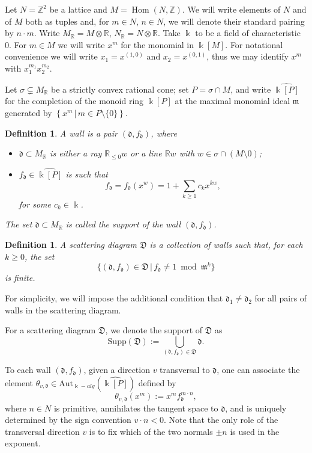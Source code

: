 \documentclass[10pt]{amsart}
\newtheorem{defn}[theorem]{Definition}
\theoremstyle{remark}
\numberwithin{equation}{section}
\newcommand{\RR}{\mathbb{R}}
\newcommand{\ZZ}{\mathbb{Z}}
\newcommand{\fd}{\mathfrak{d}}
\newcommand{\fD}{\mathfrak{D}}
\newcommand{\fm}{\mathfrak{m}}
\newcommand{\Hom}{\operatorname{Hom}}
\begin{document}
Let $N = \ZZ^2$ be a lattice and $M = \Hom (N, \ZZ)$. We will write elements of
$N$ and of $M$ both as tuples and, for $m\in N$, $n\in N$, we will denote their 
standard pairing by $n \cdot m$. Write
$M_{\RR} = M\otimes\RR$, $N_{\RR} = N\otimes\RR$. Take $\Bbbk$ to be a field of
characteristic 0.  For $m\in M$ we will write $x^m$ for the monomial in
$\Bbbk[M]$.  For notational convenience we will write $x_1=x^{(1,0)}$ and
$x_2=x^{(0,1)}$, thus we may identify $x^m$ with $x_1^{m_1}x_2^{m_2}$.

Let $\sigma \subsetneq M_{\RR}$ be a strictly convex rational cone; set
$P=\sigma \cap M$, and write $\widehat{\Bbbk[P]}$ for the completion of the
monoid ring $\Bbbk[P]$ at the maximal monomial ideal $\fm$ generated by
$\left\{x^m \,|\, m\in P\setminus\{0\}\right\}$.

\begin{defn}
  \label{walldef}
  A \emph{wall} is a pair $(\fd, f_{\fd})$, where 
  \begin{itemize}

    \item 
      $\fd \subset M_{\mathbb{R}}$ is either a ray $\RR_{\le 0} w$ or a line
      $\RR w$ with $w\in \sigma \cap(M\setminus 0)$;

    \item 
      $f_{\fd} \in \widehat{\Bbbk [P]}$ is such that 
      \[ 
        f_{\fd} = f_{\fd}(x^w) = 1 + \sum_{k\geq 1} c_k x^{k w},
      \] 
      for some $c_k \in \Bbbk$. 
  \end{itemize}
  The set $\fd \subset M_{\mathbb{R}}$ is called the \emph{support} of the wall
  $(\fd, f_{\fd})$.
\end{defn}

\begin{defn}
  \label{def:scattering_diagram}
  A scattering diagram $\fD$ is a collection of walls such that, for each $k \geq
  0$, the set
  \[
    \{ (\fd, f_{\fd}) \in \fD\, |\, f_{\fd} \neq 1 \bmod \fm^k \}
  \]
  is finite. %
\end{defn}
For simplicity, we will impose the additional condition that $\fd_1\neq \fd_2$ for all pairs of walls in the scattering diagram.

For a scattering diagram $\fD$, we denote the support of $\fD$ as
\[
  \text{Supp} (\fD) := \bigcup_{(\fd, f_{\fd}) \in \fD} \fd. 
\]

To each wall $(\fd, f_{\fd})$, given a direction $v$ transversal to $\fd$, one
can associate the element $\theta_{v,\fd}\in
{\mathrm{Aut}}_{\Bbbk-alg}\left(\widehat{\Bbbk[P]}\right)$ defined by
\[
  \theta_{v,\fd} (x^m) := x^m f_{\fd}^{m\cdot n }, 
\]
where $n\in N$ is primitive, annihilates the tangent space to $\fd$, and is
uniquely determined by the sign convention $ v\cdot n <0$.  Note
that the only role of the transversal direction $v$ is to fix which of the two
normals $\pm n$ is used in the exponent. 
\end{document}
